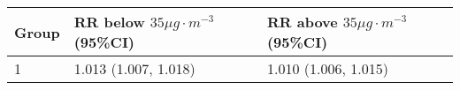 \begin{tabular}{lll}
  \hline
Group & RR below $35 \mu g \cdot m^{-3}$ (95\%CI) & RR above $35 \mu g \cdot m^{-3}$ (95\%CI) \\ 
  \hline
   1 & 1.013 (1.007, 1.018) & 1.010 (1.006, 1.015) \\ 
   \hline
\end{tabular}

